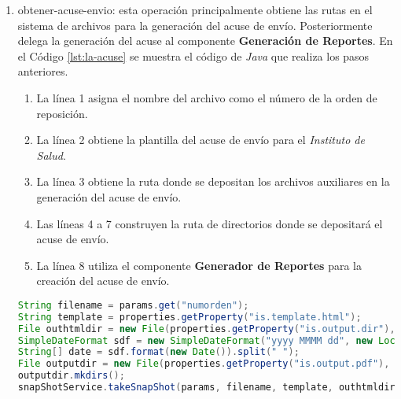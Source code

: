\begin{enumerate}
	\item obtener-acuse-envio: esta operación principalmente obtiene las rutas en el sistema de archivos para la generación del acuse de envío. Posteriormente delega la generación del acuse al componente \textbf{Generación de Reportes}. En el Código \ref{lst:la-acuse} se muestra el código de \textit{Java} que realiza los pasos anteriores.
	\begin{enumerate}
		\item La línea 1 asigna el nombre del archivo como el número de la orden de reposición.
		\item La línea 2 obtiene la plantilla del acuse de envío para el \textit{Instituto de Salud}.
		\item La línea 3 obtiene la ruta donde se depositan los archivos auxiliares en la generación del acuse de envío.
		\item Las líneas 4 a 7 construyen la ruta de directorios donde se depositará el acuse de envío.
		\item La línea 8 utiliza el componente \textbf{Generador de Reportes} para la creación del acuse de envío.
	\end{enumerate}
	\begin{lstlisting}[language=Java, caption={Generación del acuse de envío.}, captionpos=b, label={lst:la-acuse}]
String filename = params.get("numorden");
String template = properties.getProperty("is.template.html");
File outhtmldir = new File(properties.getProperty("is.output.dir"), filename + ".html");
SimpleDateFormat sdf = new SimpleDateFormat("yyyy MMMM dd", new Locale("es", "MX"));
String[] date = sdf.format(new Date()).split(" ");
File outputdir = new File(properties.getProperty("is.output.pdf"), String.format(REPORT_DIR_TMPL, date[0], date[1], date[2]));
outputdir.mkdirs();
snapShotService.takeSnapShot(params, filename, template, outhtmldir, outputdir);
	\end{lstlisting}
\end{enumerate}

